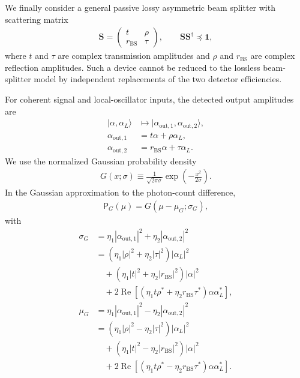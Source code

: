 \documentclass[%
final, 
superscriptaddress,
 amsmath,amssymb,amsfonts,
 aps,
 pra,
 longbibliography,
]{revtex4-2}
\newcommand{\ket}[1]{\ensuremath{|{#1}\rangle}}
\newcommand{\hcnj}[1]{{#1}^{\dagger}}
\newcommand{\vc}[1]{\mathbf{#1}}
\newcommand{\ind}[1]{\mathrm{#1}}
\newcommand{\prob}{\mathsf{P}}
\begin{document}
We finally consider a general passive lossy asymmetric beam splitter with scattering matrix~\cite{Uppu_2016}
\begin{align}
  \vc{S}
  =
  \begin{pmatrix}
    t & \rho\\
    r_{\ind{BS}} & \tau
  \end{pmatrix},
  \qquad
  \vc{S}\hcnj{\vc{S}}
  \preceq
  \vc{1},
\end{align}
where $t$ and $\tau$ are complex transmission amplitudes and $\rho$ and $r_{\ind{BS}}$ are complex reflection amplitudes. Such a device cannot be reduced to the lossless beam-splitter model by independent replacements of the two detector efficiencies.

For coherent signal and local-oscillator inputs, the detected output amplitudes are
\begin{align}
  \ket{\alpha,\alpha_L}
  &\mapsto
  \ket{\alpha_{\ind{out},1},\alpha_{\ind{out},2}},
  \\
  \alpha_{\ind{out},1}
  &=
  t\alpha+\rho\alpha_L,
  \\
  \alpha_{\ind{out},2}
  &=
  r_{\ind{BS}}\alpha+\tau\alpha_L.
\end{align}
We use the normalized Gaussian probability density
\begin{align}
  \label{eq:G-notation}
  G(x;\sigma)
  \equiv
  \frac{1}{\sqrt{2\pi\sigma}}
  \exp\!\left(
    -\frac{x^2}{2\sigma}
  \right).
\end{align}
In the Gaussian approximation to the photon-count difference,
\begin{align}
  \prob_G(\mu)
  =
  G(\mu-\mu_G;\sigma_G),
\end{align}
with
\begin{align}
  \label{eq:sigma_G-general-lossy-bs}
  \sigma_G
  &=
  \eta_1|\alpha_{\ind{out},1}|^2
  +
  \eta_2|\alpha_{\ind{out},2}|^2
  \nonumber\\
  &=
  \left(
    \eta_1|\rho|^2
    +
    \eta_2|\tau|^2
  \right)
  |\alpha_L|^2
  \nonumber\\
  &\quad
  +
  \left(
    \eta_1|t|^2
    +
    \eta_2|r_{\ind{BS}}|^2
  \right)
  |\alpha|^2
  \nonumber\\
  &\quad
  +
  2\operatorname{Re}
  \left[
    \left(
      \eta_1t\rho^*
      +
      \eta_2r_{\ind{BS}}\tau^*
    \right)
    \alpha\alpha_L^*
  \right],
  \\
  \label{eq:mu_G-general-lossy-bs}
  \mu_G
  &=
  \eta_1|\alpha_{\ind{out},1}|^2
  -
  \eta_2|\alpha_{\ind{out},2}|^2
  \nonumber\\
  &=
  \left(
    \eta_1|\rho|^2
    -
    \eta_2|\tau|^2
  \right)
  |\alpha_L|^2
  \nonumber\\
  &\quad
  +
  \left(
    \eta_1|t|^2
    -
    \eta_2|r_{\ind{BS}}|^2
  \right)
  |\alpha|^2
  \nonumber\\
  &\quad
  +
  2\operatorname{Re}
  \left[
    \left(
      \eta_1t\rho^*
      -
      \eta_2r_{\ind{BS}}\tau^*
    \right)
    \alpha\alpha_L^*
  \right].
\end{align}
\end{document}
